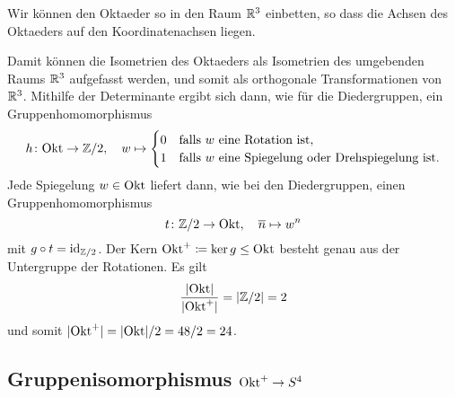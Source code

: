 Wir können den Oktaeder so in den Raum $\mathbb{R}^3$ einbetten, so dass die Achsen des Oktaeders auf den Koordinatenachsen liegen.
\begin{center}
\end{center}
Damit können die Isometrien des Oktaeders als Isometrien des umgebenden Raums $\mathbb{R}^3$ aufgefasst werden, und somit als orthogonale Transformationen von $\mathbb{R}^3$.
Mithilfe der Determinante ergibt sich dann, wie für die Diedergruppen, ein Gruppenhomomorphismus
\[
          h
  \colon  \mathrm{Okt}
  \to     \mathbb{Z}/2,
  \quad   w
  \mapsto \begin{cases}
            0 & \text{falls $w$ eine Rotation ist}, \\
            1 & \text{falls $w$ eine Spiegelung oder Drehspiegelung ist}.
          \end{cases}
\]
Jede Spiegelung $w \in \mathrm{Okt}$ liefert dann, wie bei den Diedergruppen, einen Gruppenhomomorphismus
\[
          t
  \colon  \mathbb{Z}/2
  \to     \mathrm{Okt},
  \quad   \overline{n}
  \mapsto w^n
\]
mit $g \circ t = \operatorname{id}_{\mathbb{Z}/2}$.
Der Kern $\mathrm{Okt}^+ \coloneqq \ker g \leq \mathrm{Okt}$ besteht genau aus der Untergruppe der Rotationen.
Es gilt
\[
    \frac{|\mathrm{Okt}|}{|\mathrm{Okt}^+|}
  = |\mathbb{Z}/2|
  = 2
\]
und somit $|\mathrm{Okt}^+| = |\mathrm{Okt}|/2 = 48/2 = 24$.





\subsection*{Gruppenisomorphismus $\mathrm{Okt}^+ \to S^4$}

